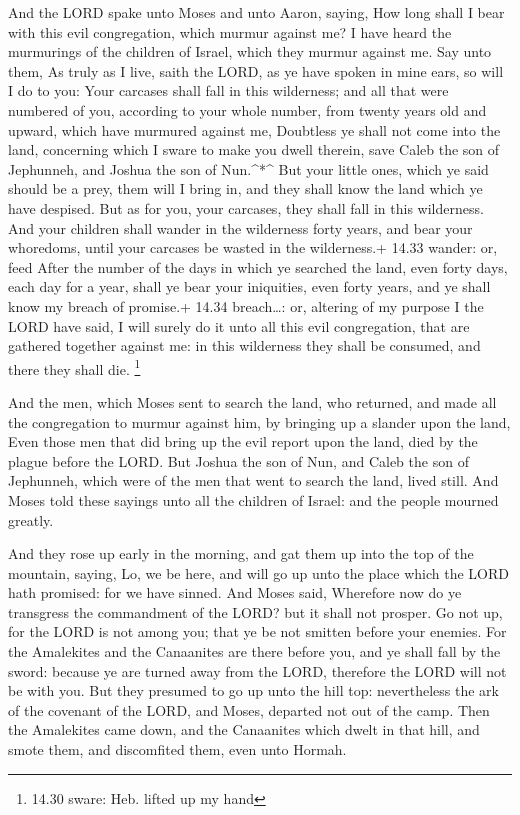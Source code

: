  And the LORD spake unto Moses and unto Aaron, saying,
 How long shall I bear with this evil congregation, which
murmur against me? I have heard the murmurings of the children of
Israel, which they murmur against me.  Say unto them, As
truly as I live, saith the LORD, as ye have spoken in mine ears, so will
I do to you:  Your carcases shall fall in this wilderness;
and all that were numbered of you, according to your whole number, from
twenty years old and upward, which have murmured against me,
 Doubtless ye shall not come into the land, concerning
which I sware to make you dwell therein, save Caleb the son of
Jephunneh, and Joshua the son of Nun.\^{}*\^{}  But your
little ones, which ye said should be a prey, them will I bring in, and
they shall know the land which ye have despised.  But as
for you, your carcases, they shall fall in this wilderness.
 And your children shall wander in the wilderness forty
years, and bear your whoredoms, until your carcases be wasted in the
wilderness.+ 14.33 wander: or, feed  After the number of
the days in which ye searched the land, even forty days, each day for a
year, shall ye bear your iniquities, even forty years, and ye shall know
my breach of promise.+ 14.34 breach\ldots: or, altering of my purpose
 I the LORD have said, I will surely do it unto all this
evil congregation, that are gathered together against me: in this
wilderness they shall be consumed, and there they shall die. \footnote{14.30
  sware: Heb. lifted up my hand}

 And the men, which Moses sent to search the land, who
returned, and made all the congregation to murmur against him, by
bringing up a slander upon the land,  Even those men that
did bring up the evil report upon the land, died by the plague before
the LORD.  But Joshua the son of Nun, and Caleb the son of
Jephunneh, which were of the men that went to search the land, lived
still.  And Moses told these sayings unto all the children
of Israel: and the people mourned greatly.

 And they rose up early in the morning, and gat them up
into the top of the mountain, saying, Lo, we be here, and will go up
unto the place which the LORD hath promised: for we have sinned.
 And Moses said, Wherefore now do ye transgress the
commandment of the LORD? but it shall not prosper.  Go not
up, for the LORD is not among you; that ye be not smitten before your
enemies.  For the Amalekites and the Canaanites are there
before you, and ye shall fall by the sword: because ye are turned away
from the LORD, therefore the LORD will not be with you. 
But they presumed to go up unto the hill top: nevertheless the ark of
the covenant of the LORD, and Moses, departed not out of the camp.
 Then the Amalekites came down, and the Canaanites which
dwelt in that hill, and smote them, and discomfited them, even unto
Hormah.

